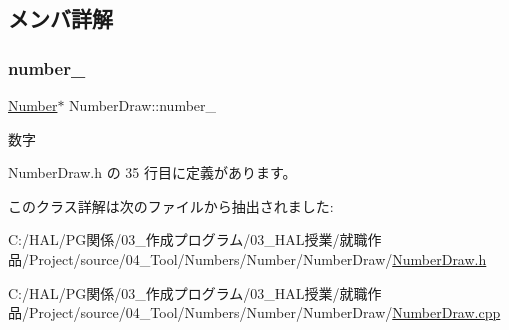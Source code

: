 \subsection{メンバ詳解}
\mbox{\label{class_number_draw_a8063f58804542a7f86b341eec4cc1e60}} 
\subsubsection{\texorpdfstring{number\+\_\+}{number\_}}
{\footnotesize\ttfamily \mbox{\hyperlink{class_number}{Number}}$\ast$ Number\+Draw\+::number\+\_\+\hspace{0.3cm}{\ttfamily [private]}}



数字 



 Number\+Draw.\+h の 35 行目に定義があります。



このクラス詳解は次のファイルから抽出されました\+:\begin{DoxyCompactItemize}
\item 
C\+:/\+H\+A\+L/\+P\+G関係/03\+\_\+作成プログラム/03\+\_\+\+H\+A\+L授業/就職作品/\+Project/source/04\+\_\+\+Tool/\+Numbers/\+Number/\+Number\+Draw/\mbox{\hyperlink{_number_draw_8h}{Number\+Draw.\+h}}\item 
C\+:/\+H\+A\+L/\+P\+G関係/03\+\_\+作成プログラム/03\+\_\+\+H\+A\+L授業/就職作品/\+Project/source/04\+\_\+\+Tool/\+Numbers/\+Number/\+Number\+Draw/\mbox{\hyperlink{_number_draw_8cpp}{Number\+Draw.\+cpp}}\end{DoxyCompactItemize}
